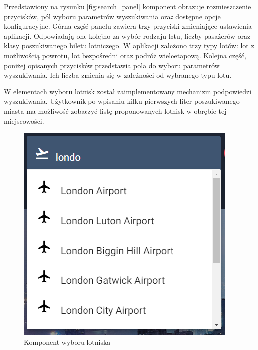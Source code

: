 \documentclass[12pt, twoside]{report}
\begin{document}
Przedstawiony na rysunku \ref{fig:search_panel} komponent obrazuje rozmieszczenie przycisków, pól wyboru parametrów wyszukiwania oraz dostępne opcje konfiguracyjne. Górna część panelu zawiera trzy przyciski zmieniające ustawienia aplikacji. Odpowiadają one kolejno za wybór rodzaju lotu, liczby pasażerów oraz klasy poszukiwanego biletu lotniczego. W aplikacji założono trzy typy lotów: lot z możliwością powrotu, lot bezpośredni oraz podróż wieloetapową. Kolejna część, poniżej opisanych przycisków przedstawia pola do wyboru parametrów wyszukiwania. Ich liczba zmienia się w zależności od wybranego typu lotu.

W elementach wyboru lotnisk został zaimplementowany mechanizm podpowiedzi wyszukiwania. Użytkownik po wpisaniu kilku pierwszych liter poszukiwanego miasta ma możliwość zobaczyć listę proponowanych lotnisk w obrębie tej miejscowości. 
\begin{figure}[!ht]
\centering
\includegraphics[scale=0.8, keepaspectratio]{airport_choose.png}
\caption{Komponent wyboru lotniska}
\label{fig:airport_choose}
\end{figure}
\end{document}
